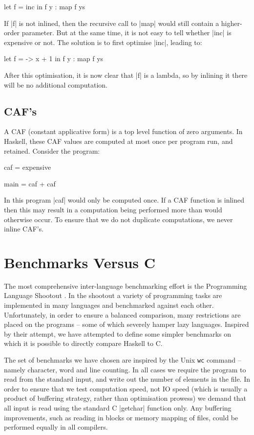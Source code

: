 \documentclass{llncs}
\begin{document}
\begin{code}
let f = inc
in f y : map f ys
\end{code}

If |f| is not inlined, then the recursive call to |map| would still contain a higher-order parameter. But at the same time, it is not easy to tell whether |inc| is expensive or not. The solution is to first optimise |inc|, leading to:

\begin{code}
let f = \x -> x + 1
in f y : map f ys
\end{code}

After this optimisation, it is now clear that |f| is a lambda, so by inlining it there will be no additional computation.

\subsection{CAF's}
\label{sec:caf}

A CAF (constant applicative form) is a top level function of zero arguments. In Haskell, these CAF values are computed at most once per program run, and retained. Consider the program:

\begin{code}
caf = expensive

main = caf + caf
\end{code}

In this program |caf| would only be computed once. If a CAF function is inlined then this may result in a computation being performed more than would otherwise occur. To ensure that we do not duplicate computations, we never inline CAF's.

\section{Benchmarks Versus C}

The most comprehensive inter-language benchmarking effort is the Programming Language Shootout \cite{shootout}. In the shootout a variety of programming tasks are implemented in many languages and benchmarked against each other. Unfortunately, in order to ensure a balanced comparison, many restrictions are placed on the programs -- some of which severely hamper lazy languages. Inspired by their attempt, we have attempted to define some simpler benchmarks on which it is possible to directly compare Haskell to C.

The set of benchmarks we have chosen are inspired by the Unix \texttt{wc} command -- namely character, word and line counting. In all cases we require the program to read from the standard input, and write out the number of elements in the file. In order to ensure that we test computation speed, not IO speed (which is usually a product of buffering strategy, rather than optimisation prowess) we demand that all input is read using the standard C |getchar| function only. Any buffering improvements, such as reading in blocks or memory mapping of files, could be performed equally in all compilers.
\end{document}
